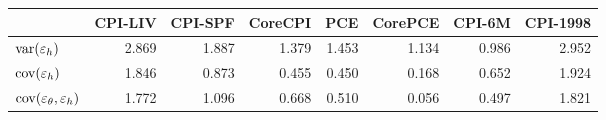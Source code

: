 \begin{tabular}{lrrrrrrr}
\toprule
{} &  CPI-LIV &  CPI-SPF &  CoreCPI &    PCE &  CorePCE &  CPI-6M &  CPI-1998 \\
\midrule
$\operatorname{var}(\varepsilon_h)$  &    2.869 &    1.887 &    1.379 &  1.453 &    1.134 &   0.986 &     2.952 \\
$\operatorname{cov}(\varepsilon_h)$  &    1.846 &    0.873 &    0.455 &  0.450 &    0.168 &   0.652 &     1.924 \\
$\operatorname{cov}(\varepsilon_\theta, \varepsilon_h)$ &    1.772 &    1.096 &    0.668 &  0.510 &    0.056 &   0.497 &     1.821 \\
\bottomrule
\end{tabular}
